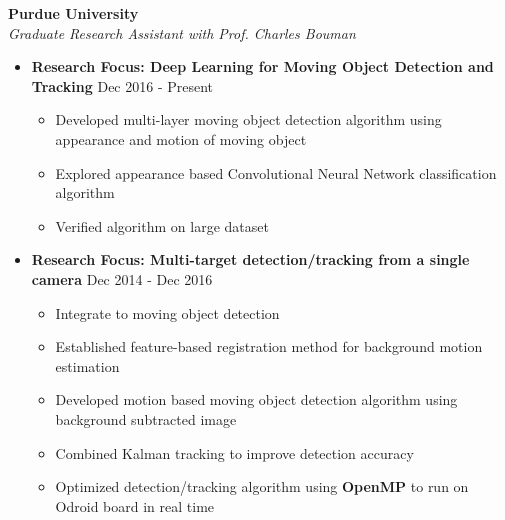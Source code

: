 \documentclass[10pt]{article}
\newenvironment{outerlist}[1][\enskip\textbullet]%
        {\begin{itemize}[#1,leftmargin=*]}{\end{itemize}%
         \vspace{-1.2\baselineskip}}
\newenvironment{innerlist}[1][\enskip\textbullet]%
        {\begin{itemize}[#1,leftmargin=*,parsep=0pt,itemsep=0pt,topsep=0pt,partopsep=0pt]}
        {\end{itemize}}
\begin{document}
\textbf{Purdue University } \\
\emph{Graduate Research Assistant with Prof. Charles Bouman} 
\begin{outerlist}
 \vspace{-.1in}
\item[] \textbf{Research Focus: Deep Learning for Moving Object Detection and Tracking} \hfill {Dec 2016 - Present}
\begin{innerlist}
\vspace{-.05in}        
        \item Developed multi-layer moving object detection algorithm using appearance and motion of moving object
        \item Explored appearance based Convolutional Neural Network classification algorithm  
        \item Verified algorithm on large dataset  	
        \end{innerlist}
\item[] \textbf{Research Focus: Multi-target detection/tracking from a single camera } \hfill {Dec 2014 - Dec 2016}
        \begin{innerlist}
\vspace{-.05in}
        \item Integrate %
        to moving object detection
        \item Established feature-based registration method for background motion estimation
        \item Developed motion based moving object detection algorithm using background subtracted image
        \item Combined Kalman tracking to improve detection accuracy
        \item Optimized detection/tracking algorithm using \textbf{OpenMP} to run on Odroid board in real time

\end{innerlist}
\end{outerlist}
\end{document}
